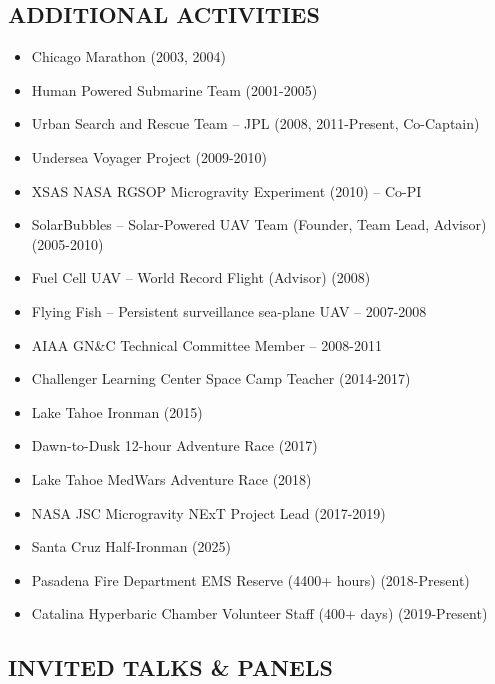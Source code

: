 \documentclass[11pt,letterpaper]{article}
\begin{document}
\subsection*{ADDITIONAL ACTIVITIES}
\begin{itemize}
\item Chicago Marathon (2003, 2004)
\item Human Powered Submarine Team (2001-2005)
\item Urban Search and Rescue Team – JPL (2008, 2011-Present, Co-Captain)
\item Undersea Voyager Project (2009-2010)
\item XSAS NASA RGSOP Microgravity Experiment (2010) – Co-PI
\item SolarBubbles – Solar-Powered UAV Team (Founder, Team Lead, Advisor) (2005-2010)
\item Fuel Cell UAV – World Record Flight (Advisor) (2008)
\item Flying Fish – Persistent surveillance sea-plane UAV – 2007-2008
\item AIAA GN\&C Technical Committee Member – 2008-2011
\item Challenger Learning Center Space Camp Teacher (2014-2017)
\item Lake Tahoe Ironman (2015)
\item Dawn-to-Dusk 12-hour Adventure Race (2017)
\item Lake Tahoe MedWars Adventure Race (2018)
\item NASA JSC Microgravity NExT Project Lead (2017-2019)
\item Santa Cruz Half-Ironman (2025)
\item Pasadena Fire Department EMS Reserve (4400+ hours) (2018-Present)
\item Catalina Hyperbaric Chamber Volunteer Staff (400+ days) (2019-Present)
\end{itemize}

\subsection*{INVITED TALKS \& PANELS}
\end{document}
